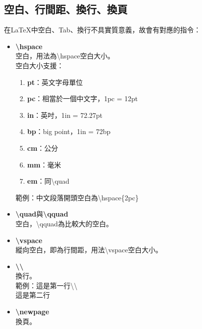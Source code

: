 \documentclass[12pt]{article}
\begin{document}
\begin{CJK*}{UTF8}{bsmi}
		\subsection{空白、行間距、換行、換頁}
			在LaTeX中空白、Tab、換行不具實質意義，故會有對應的指令： \\
			\begin{itemize}
				\item \textbf{\textbackslash hspace} \\
					空白，用法為\textbackslash hspace{空白大小}。\\
					空白大小支援：
					\begin{enumerate}[(1)]
						\item \textbf{pt}：英文字母單位
						\item \textbf{pc}：相當於一個中文字，1pc = 12pt
						\item \textbf{in}：英吋，1in = 72.27pt
						\item \textbf{bp}：big point，1in = 72bp
						\item \textbf{cm}：公分
						\item \textbf{mm}：毫米
						\item \textbf{em}：同\textbackslash quad
					\end{enumerate}
					範例：中文段落開頭空白為\textbackslash hspace\{2pc\}
				\item \textbf{\textbackslash quad}與\textbf{\textbackslash qquad} \\
					空白，\textbackslash qquad為比較大的空白。
				\item \textbf{\textbackslash vspace} \\
					縱向空白，即為行間距，用法\textbackslash vspace{空白大小}。
				\item \textbf{\textbackslash \textbackslash} \\
					換行。 \\
					範例：這是第一行\textbackslash \textbackslash \\
				\hspace*{3pc}這是第二行
				\item \textbf{\textbackslash newpage} \\
					換頁。
			\end{itemize}
		
		\newpage
		

\end{CJK*}
\end{document}
